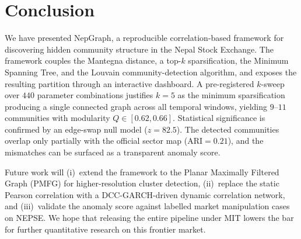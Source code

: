 \section{Conclusion}
\label{sec:conclusion}

We have presented NepGraph, a reproducible correlation-based framework
for discovering hidden community structure in the Nepal Stock
Exchange.  The framework couples the Mantegna distance, a top-$k$
sparsification, the Minimum Spanning Tree, and the Louvain
community-detection algorithm, and exposes the resulting partition
through an interactive dashboard.  A pre-registered $k$-sweep over
$440$ parameter combinations justifies $k=5$ as the minimum
sparsification producing a single connected graph across all temporal
windows, yielding $9$--$11$ communities with modularity
$Q\in[0.62,0.66]$.  Statistical significance is confirmed by an
edge-swap null model ($z=82.5$).  The detected communities overlap
only partially with the official sector map ($\text{ARI}=0.21$), and
the mismatches can be surfaced as a transparent anomaly score.

Future work will (i)~extend the framework to the Planar Maximally
Filtered Graph (PMFG) for higher-resolution cluster detection,
(ii)~replace the static Pearson correlation with a DCC-GARCH-driven
dynamic correlation network, and (iii)~validate the anomaly score
against labelled market manipulation cases on NEPSE.  We hope that
releasing the entire pipeline under MIT lowers the bar for further
quantitative research on this frontier market.

\newpage
